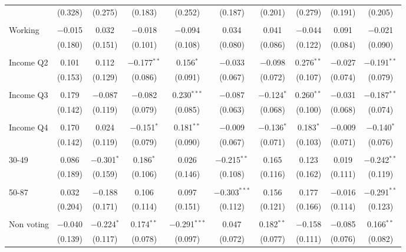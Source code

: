 \begin{tabular}{@{\extracolsep{5pt}}lccccccccc}
  & (0.328) & (0.275) & (0.183) & (0.252) & (0.187) & (0.201) & (0.279) & (0.191) & (0.205) \\ 
  & & & & & & & & & \\ 
 Working & $-$0.015 & 0.032 & $-$0.018 & $-$0.094 & 0.034 & 0.041 & $-$0.044 & 0.091 & $-$0.021 \\ 
  & (0.180) & (0.151) & (0.101) & (0.108) & (0.080) & (0.086) & (0.122) & (0.084) & (0.090) \\ 
  & & & & & & & & & \\ 
 Income Q2 & 0.101 & 0.112 & $-$0.177$^{**}$ & 0.156$^{*}$ & $-$0.033 & $-$0.098 & 0.276$^{**}$ & $-$0.027 & $-$0.191$^{**}$ \\ 
  & (0.153) & (0.129) & (0.086) & (0.091) & (0.067) & (0.072) & (0.107) & (0.074) & (0.079) \\ 
  & & & & & & & & & \\ 
 Income Q3 & 0.179 & $-$0.087 & $-$0.082 & 0.230$^{***}$ & $-$0.087 & $-$0.124$^{*}$ & 0.260$^{**}$ & $-$0.031 & $-$0.187$^{**}$ \\ 
  & (0.142) & (0.119) & (0.079) & (0.085) & (0.063) & (0.068) & (0.100) & (0.068) & (0.074) \\ 
  & & & & & & & & & \\ 
 Income Q4 & 0.170 & 0.024 & $-$0.151$^{*}$ & 0.181$^{**}$ & $-$0.009 & $-$0.136$^{*}$ & 0.183$^{*}$ & $-$0.009 & $-$0.140$^{*}$ \\ 
  & (0.142) & (0.119) & (0.079) & (0.090) & (0.067) & (0.071) & (0.103) & (0.071) & (0.076) \\ 
  & & & & & & & & & \\ 
 30-49 & 0.086 & $-$0.301$^{*}$ & 0.186$^{*}$ & 0.026 & $-$0.215$^{**}$ & 0.165 & 0.123 & 0.019 & $-$0.242$^{**}$ \\ 
  & (0.189) & (0.159) & (0.106) & (0.146) & (0.108) & (0.116) & (0.162) & (0.111) & (0.119) \\ 
  & & & & & & & & & \\ 
 50-87 & 0.032 & $-$0.188 & 0.106 & 0.097 & $-$0.303$^{***}$ & 0.156 & 0.177 & $-$0.016 & $-$0.291$^{**}$ \\ 
  & (0.204) & (0.171) & (0.114) & (0.151) & (0.112) & (0.121) & (0.166) & (0.114) & (0.123) \\ 
  & & & & & & & & & \\ 
 Non voting & $-$0.040 & $-$0.224$^{*}$ & 0.174$^{**}$ & $-$0.291$^{***}$ & 0.047 & 0.182$^{**}$ & $-$0.158 & $-$0.085 & 0.166$^{**}$ \\ 
  & (0.139) & (0.117) & (0.078) & (0.097) & (0.072) & (0.077) & (0.111) & (0.076) & (0.082) \\ 

\end{tabular}
